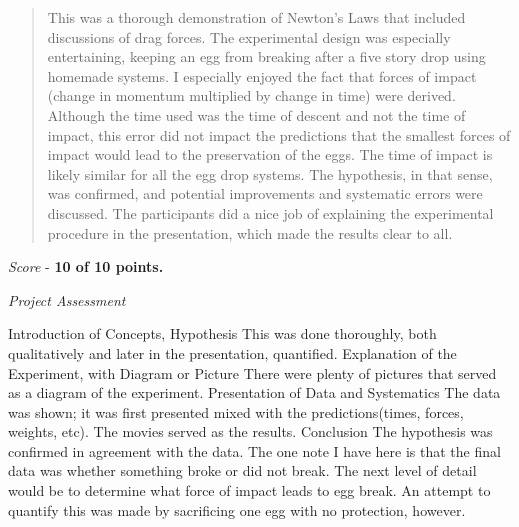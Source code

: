 \documentclass[10pt]{article}
\begin{document}
\maketitle

\begin{abstract}
This was a thorough demonstration of Newton's Laws that included discussions of drag forces.  The experimental design was especially entertaining, keeping an egg from breaking after a five story drop using homemade systems.  I especially enjoyed the fact that forces of impact (change in momentum multiplied by change in time) were derived.  Although the time used was the time of descent and not the time of impact, this error did not impact the predictions that the smallest forces of impact would lead to the preservation of the eggs.  The time of impact is likely similar for all the egg drop systems.  The hypothesis, in that sense, was confirmed, and potential improvements and systematic errors were discussed.  The participants did a nice job of explaining the experimental procedure in the presentation, which made the results clear to all.
\end{abstract}

\textit{Score} - \textbf{10 of 10 points.}

\textit{Project Assessment}
\begin{outline}[enumerate]
\1 Introduction of Concepts, Hypothesis
\2 This was done thoroughly, both qualitatively and later in the presentation, quantified.
\1 Explanation of the Experiment, with Diagram or Picture
\2 There were plenty of pictures that served as a diagram of the experiment.
\1 Presentation of Data and Systematics
\2 The data was shown; it was first presented mixed with the predictions(times, forces, weights, etc).  The movies served as the results.
\1 Conclusion
\2 The hypothesis was confirmed in agreement with the data.  The one note I have here is that the final data was whether something broke or did not break.  The next level of detail would be to determine what force of impact leads to egg break.  An attempt to quantify this was made by sacrificing one egg with no protection, however.
\end{outline}
\end{document}
